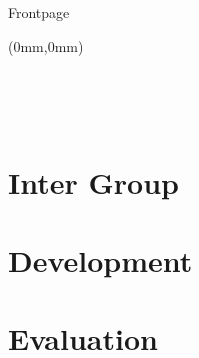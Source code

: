 
%

	Frontpage
	\listoftodos
	\begin{titlepage}
	\begin{textblock*}{297mm}(0mm,0mm)
		 \hspace{-6.5mm}

		

	\end{textblock*}
	\thispagestyle{empty}

\ \pagebreak{} 
	\end{titlepage}
\ \thispagestyle{empty} \ \pagebreak{}



\tableofcontents
\cleardoublepage
	
\newpage
\thispagestyle{empty}
\begin{titlepage}
\end{titlepage}
	
	
	\part{Inter Group}
	
	
 
\part{Development}

	
	
	

	
	
	
	
	
	
	
	
	
	
\part{Evaluation}
	
	
	
		
		
		
		

	\cleardoublepage
{}
\label{chap:bib}

\listoffigures
\lstlistoflistings

\appendix	
	

